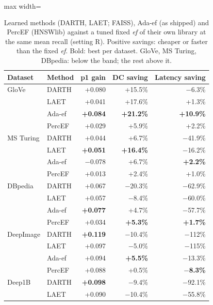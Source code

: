 \documentclass[twocolumn]{svjour3}
\newcommand{\ef}{\textit{ef}}
\begin{document}
\begin{table}[t]
  \caption{Learned methods (DARTH, LAET; FAISS), Ada-ef (as shipped) and PercEF (HNSWlib) against a
  tuned fixed \ef{} of their own library at the same mean recall (setting R). Positive savings:
  cheaper or faster than the fixed \ef{}. Bold: best per dataset. GloVe, MS Turing, DBpedia: below
  the band; the rest above it.}
  \label{tab:darth}
  \centering\footnotesize
  \begin{adjustbox}{max width=\linewidth}\begin{tabular}{llrrr}
    \toprule
    Dataset & Method & p1 gain & DC saving & Latency saving \\
    \midrule
    GloVe         & DARTH  & +0.080 & +15.5\% & $-$6.3\% \\
                  & LAET   & +0.041 & +17.6\% & +1.3\% \\
                  & Ada-ef & \textbf{+0.084} & \textbf{+21.2\%} & \textbf{+10.9\%} \\
                  & PercEF & +0.029 & +5.9\% & +2.2\% \\
    \midrule
    MS Turing     & DARTH  & +0.044 & +6.7\% & $-$41.9\% \\
                  & LAET   & \textbf{+0.051} & \textbf{+16.4\%} & $-$16.2\% \\
                  & Ada-ef & $-$0.078 & +6.7\% & \textbf{+2.2\%} \\
                  & PercEF & +0.013 & +2.4\% & +1.0\% \\
    \midrule
    DBpedia       & DARTH  & +0.067 & $-$20.3\% & $-$62.9\% \\
                  & LAET   & +0.057 & $-$8.4\% & $-$60.0\% \\
                  & Ada-ef & \textbf{+0.077} & +4.7\% & $-$57.7\% \\
                  & PercEF & +0.034 & \textbf{+5.3\%} & \textbf{+1.7\%} \\
    \midrule
    DeepImage     & DARTH  & \textbf{+0.119} & $-$10.4\% & $-$112\% \\
                  & LAET   & +0.097 & $-$5.0\% & $-$115\% \\
                  & Ada-ef & +0.094 & \textbf{+5.5\%} & $-$13.3\% \\
                  & PercEF & +0.088 & +0.5\% & \textbf{$-$8.3\%} \\
    \midrule
    Deep1B        & DARTH  & \textbf{+0.098} & $-$9.4\% & $-$92.1\% \\
                  & LAET   & +0.090 & $-$10.4\% & $-$55.8\% \\

\end{tabular}
\end{adjustbox}
\end{table}
\end{document}
